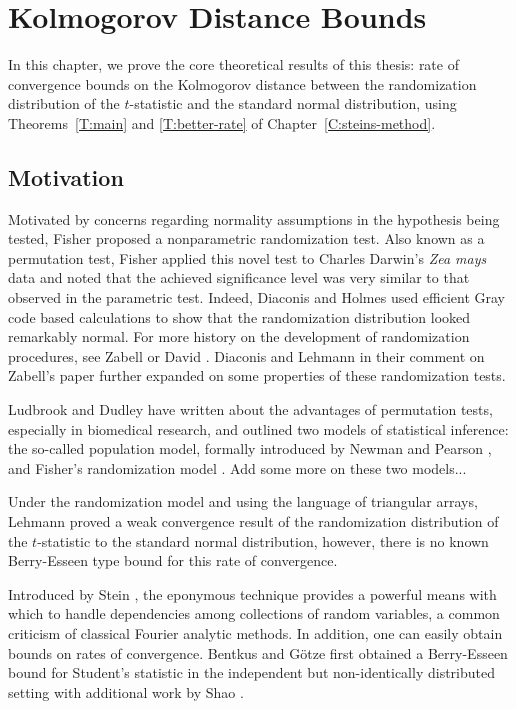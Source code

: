 \chapter{Kolmogorov Distance Bounds}
\label{C:stein-proof} In this chapter, we prove the core theoretical
results of this thesis: rate of convergence bounds on the Kolmogorov
distance between the randomization distribution of the $t$-statistic
and the standard normal distribution, using
Theorems~\ref{T:main} and \ref{T:better-rate} of Chapter~\ref{C:steins-method}.

\section{Motivation}
Motivated by concerns regarding normality
assumptions in the hypothesis being tested, Fisher
\cite{fisher1935design} proposed a nonparametric randomization test.
Also known as a permutation test, Fisher applied this novel test to
Charles Darwin's \emph{Zea mays} data and noted that the achieved
significance level was very similar to that observed in the parametric
test.  Indeed, Diaconis and Holmes \cite{diaconis1994gray} used
efficient Gray code based calculations to show that the randomization
distribution looked remarkably normal.  For more history on the
development of randomization procedures, see Zabell
\cite{zabell2008student} or David \cite{david2008beginnings}.
Diaconis and Lehmann \cite{diaconis2008comment} in their comment on
Zabell's paper further expanded on some properties of these
randomization tests.

Ludbrook and Dudley \cite{ludbrook1998permutation} have written about
the advantages of permutation tests, especially in biomedical
research, and outlined two models of statistical inference: the
so-called population model, formally introduced by Newman and Pearson
\cite{neyman1928use}, and Fisher's randomization model
\cite{fisher1935design}.  Add some more on these two models...

Under the randomization model and using the language of triangular
arrays, Lehmann \cite{lehmann1999elements} proved a weak convergence
result of the randomization distribution of the $t$-statistic to the
standard normal distribution, however, there is no known Berry-Esseen
type bound for this rate of convergence.

Introduced by Stein \cite{stein1986approximate}, the eponymous
technique provides a powerful means with which to handle dependencies
among collections of random variables, a common criticism of classical
Fourier analytic methods.  In addition, one can easily obtain bounds
on rates of convergence.  Bentkus and G{\"o}tze
\cite{bentkus1996berry} first obtained a Berry-Esseen bound for
Student's statistic in the independent but non-identically distributed
setting with additional work by Shao \cite{shao2005explicit}.

